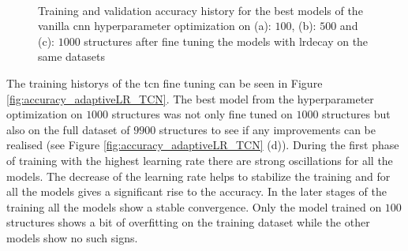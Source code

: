 \documentclass[conference]{IEEEtran}
\begin{document}
\begin{figure}[htp]
	\centering
	\quad
	\\
	\caption{Training and validation accuracy history for the best models of the vanilla \gls{cnn} hyperparameter optimization on (a): $ 100 $, (b): $ 500 $ and (c): $ 1000 $ structures after fine tuning the models with \gls{lrdecay} on the same datasets}
	\label{fig:accuracy_adaptiveLR_CNN}
\end{figure}

 The training historys of the \gls{tcn} fine tuning can be seen in Figure \ref{fig:accuracy_adaptiveLR_TCN}. The best model from the hyperparameter optimization on $ 1000 $ structures was not only fine tuned on $ 1000 $ structures but also on the full dataset of $ 9900 $ structures to see if any improvements can be realised (see Figure \ref{fig:accuracy_adaptiveLR_TCN} (d)). During the first phase of training with the highest learning rate there are strong oscillations for all the models. The decrease of the learning rate helps to stabilize the training and for all the models gives a significant rise to the accuracy. In the later stages of the training all the models show a stable convergence. Only the model trained on $ 100 $ structures shows a bit of overfitting on the training dataset while the other models show no such signs. 
\end{document}
